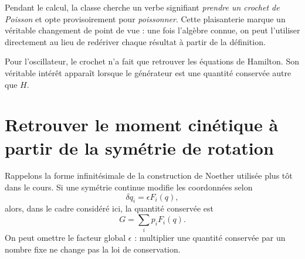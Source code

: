 Pendant le calcul, la classe cherche un verbe signifiant
\emph{prendre un crochet de Poisson} et opte provisoirement pour
\emph{poissonner}. Cette plaisanterie marque un véritable changement de point de vue : une fois l’algèbre connue, on peut l’utiliser directement au lieu de redériver chaque résultat à partir de la définition.

\begin{classroomqa}
\end{classroomqa}

\begin{classroomqa}
\end{classroomqa}

Pour l’oscillateur, le crochet n’a fait que retrouver les équations de Hamilton. Son véritable intérêt apparaît lorsque le générateur est une quantité conservée autre que \(H\).

\section{Retrouver le moment cinétique à partir de la symétrie de rotation}

Rappelons la forme infinitésimale de la construction de Noether utilisée plus tôt dans le cours. Si une symétrie continue modifie les coordonnées selon
\begin{equation}
  \delta q_i=\epsilon F_i(q),
  \label{eq:l8-noether-variation}
\end{equation}
alors, dans le cadre considéré ici, la quantité conservée est
\begin{equation}
  G=\sum_i p_iF_i(q).
  \label{eq:l8-noether-charge}
\end{equation}
On peut omettre le facteur global \(\epsilon\) : multiplier une quantité conservée par un nombre fixe ne change pas la loi de conservation.

